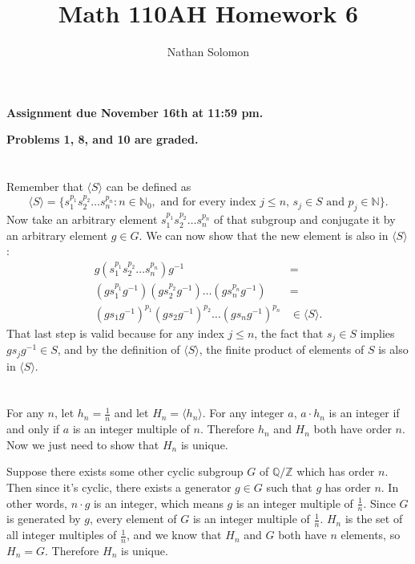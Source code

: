\documentclass[12pt]{article}
\begin{document}
\title{Math 110AH Homework 6}
\author{Nathan Solomon}
\maketitle

\textbf{Assignment due November 16th at 11:59 pm.}
\par
\textbf{Problems 1, 8, and 10 are graded.}

\section{}
\noindent{}\bigskip

Remember that $\langle S \rangle$ can be defined as
\[ \langle S \rangle = \{ s_1^{p_1} s_2^{p_2} \dots s_n^{p_n}: n \in \mathbb{N}_0, \text{ and for every index $j \leq n$, } s_j \in S \text{ and } p_j \in \mathbb{N} \}. \]
Now take an arbitrary element $s_1^{p_1} s_2^{p_2} \dots s_n^{p_n}$ of that subgroup and conjugate it by an arbitrary element $g \in G$. We can now show that the new element is also in $\langle S \rangle$:
\begin{align*}
    g (s_1^{p_1} s_2^{p_2} \dots s_n^{p_n}) g^{-1} &= \\
    (g s_1^{p_1} g^{-1}) (g s_2^{p_2} g^{-1}) \dots (g s_n^{p_n} g^{-1}) &= \\
    (g s_1 g^{-1})^{p_1} (g s_2 g^{-1})^{p_2} \dots (g s_n g^{-1})^{p_n} &\in \langle S \rangle.
\end{align*}
That last step is valid because for any index $j \leq n$, the fact that $s_j \in S$ implies $g s_j g^{-1} \in S$, and by the definition of $\langle S \rangle$, the finite product of elements of $S$ is also in $\langle S \rangle$.

\section{}
\noindent{}\bigskip

For any $n$, let $h_n = \frac{1}{n}$ and let $H_n = \langle h_n \rangle$. For any integer $a$, $a \cdot h_n$ is an integer if and only if $a$ is an integer multiple of $n$. Therefore $h_n$ and $H_n$ both have order $n$. Now we just need to show that $H_n$ is unique.
\par
Suppose there exists some other cyclic subgroup $G$ of $ \mathbb{Q} / \mathbb{Z}$ which has order $n$. Then since it's cyclic, there exists a generator $g \in G$ such that $g$ has order $n$. In other words, $n \cdot g$ is an integer, which means $g$ is an integer multiple of $ \frac{1}{n} $. Since $G$ is generated by $g$, every element of $G$ is an integer multiple of $ \frac{1}{n} $. $H_n$ is the set of all integer multiples of $ \frac{1}{n} $, and we know that $H_n$ and $G$ both have $n$ elements, so $H_n = G$. Therefore $H_n$ is unique.
\end{document}
